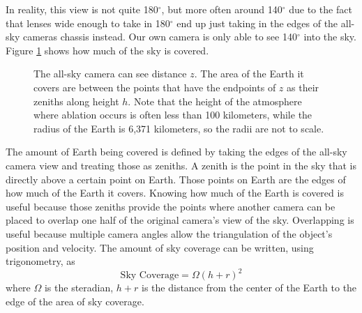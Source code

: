 In reality, this view is not quite 180$^{\circ}$, but more often around 140$^{\circ}$ due to the fact that lenses wide enough to take in 180$^{\circ}$ end up just taking in the edges of the all-sky cameras chassis instead. Our own camera is only able to see 140$^{\circ}$ into the sky. Figure \ref{fig:atmosphere} shows how much of the sky is covered.
\begin{figure}[ht!]
	\centering
	\caption{The all-sky camera can see distance $z$. The area of the Earth it covers are between the points that have the endpoints of $z$ as their zeniths along height $h$. Note that the height of the atmosphere where ablation occurs is often less than 100 kilometers, while the radius of the Earth is 6,371 kilometers, so the radii are not to scale.}
	\label{fig:atmosphere}
\end{figure}
The amount of Earth being covered is defined by taking the edges of the all-sky camera view and treating those as zeniths. A zenith is the point in the sky that is directly above a certain point on Earth. Those points on Earth are the edges of how much of the Earth it covers. Knowing how much of the Earth is covered is useful because those zeniths provide the points where another camera can be placed to overlap one half of the original camera's view of the sky. Overlapping is useful because multiple camera angles allow the triangulation of the object's position and velocity. The amount of sky coverage can be written, using trigonometry, as
\begin{equation} \label{eq:coverage}
	\textrm{Sky Coverage} = \Omega(h+r)^2
\end{equation}
where $\Omega$ is the steradian, $h+r$ is the distance from the center of the Earth to the edge of the area of sky coverage.

